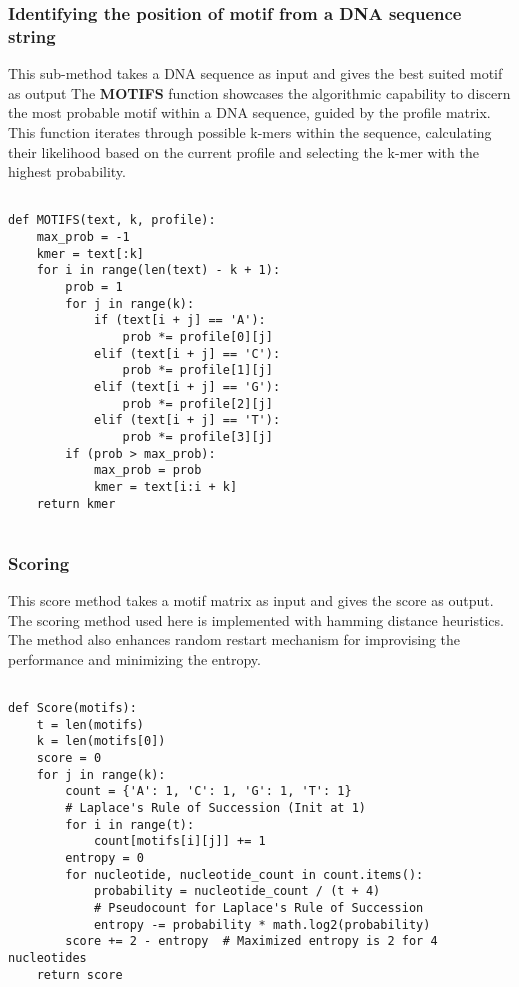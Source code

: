 \subsubsection{Identifying the position of motif from a DNA sequence string}
This sub-method takes a DNA sequence as input and gives the best suited motif as output
The \textbf{MOTIFS} function showcases the algorithmic capability to discern the most probable motif within a DNA sequence, guided by the profile matrix. This function iterates through possible k-mers within the sequence, calculating their likelihood based on the current profile and selecting the k-mer with the highest probability.

\begin{verbatim}

def MOTIFS(text, k, profile):
    max_prob = -1
    kmer = text[:k]
    for i in range(len(text) - k + 1):
        prob = 1
        for j in range(k):
            if (text[i + j] == 'A'):
                prob *= profile[0][j]
            elif (text[i + j] == 'C'):
                prob *= profile[1][j]
            elif (text[i + j] == 'G'):
                prob *= profile[2][j]
            elif (text[i + j] == 'T'):
                prob *= profile[3][j]
        if (prob > max_prob):
            max_prob = prob
            kmer = text[i:i + k]
    return kmer
    
\end{verbatim}

\subsubsection{Scoring}

This score method takes a motif matrix as input and gives the score as output. The scoring method used here is implemented with hamming distance heuristics. The method also enhances random restart mechanism for improvising the performance and minimizing the entropy.

\begin{verbatim}

def Score(motifs):
    t = len(motifs)
    k = len(motifs[0])
    score = 0
    for j in range(k):
        count = {'A': 1, 'C': 1, 'G': 1, 'T': 1}  
        # Laplace's Rule of Succession (Init at 1)
        for i in range(t):
            count[motifs[i][j]] += 1
        entropy = 0
        for nucleotide, nucleotide_count in count.items():
            probability = nucleotide_count / (t + 4)  
            # Pseudocount for Laplace's Rule of Succession
            entropy -= probability * math.log2(probability)
        score += 2 - entropy  # Maximized entropy is 2 for 4 nucleotides
    return score
    
\end{verbatim}

